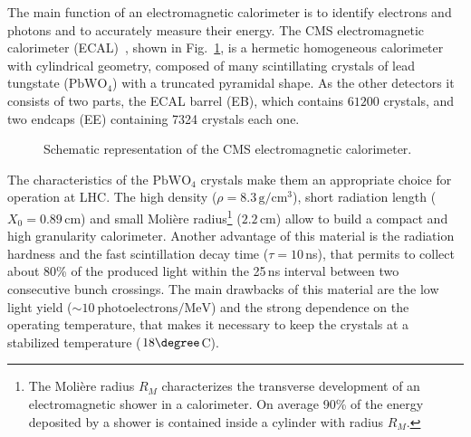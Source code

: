 The main function of an electromagnetic calorimeter is to identify electrons and photons and to accurately measure their energy. The CMS electromagnetic calorimeter (ECAL)~\cite{ecal,Bloch:581342}, shown in Fig.~\ref{fig:ecal}, is a hermetic homogeneous calorimeter with cylindrical geometry, composed of many scintillating crystals of lead tungstate ($\mathrm{PbWO_4}$) with a truncated pyramidal shape. As the other detectors it consists of two parts, the ECAL barrel (EB), which contains $61200$ crystals, and two endcaps (EE) containing 7324 crystals each one.

\begin{figure}[htb]
\centering
{}
\caption{Schematic representation of the CMS electromagnetic calorimeter.}\label{fig:ecal}
\end{figure}

The characteristics of the $\mathrm{PbWO_4}$ crystals make them an appropriate choice for operation at LHC. The high density ($\rho=8.3\,\mathrm{g/cm^3}$), short radiation length ($X_0 = 0.89\,\mathrm{cm}$) and small Moli\`ere radius\footnote{The Moli\`ere radius $R_M$ characterizes the transverse development of an electromagnetic shower in a calorimeter. On average 90\% of the energy deposited by a shower is contained inside a cylinder with radius $R_M$.} ($2.2$\,cm) allow to build a compact and high granularity calorimeter. Another advantage of this material is the radiation hardness and the fast scintillation decay time ($\tau = 10$\,ns), that permits to collect about 80\% of the produced light within the 25\,ns interval between two consecutive bunch crossings. The main drawbacks of this material are the low light yield ($\sim 10~\mathrm{photoelectrons/MeV}$) and the strong dependence on the operating temperature, that makes it necessary to keep the crystals at a stabilized temperature ($18\degree$C).

